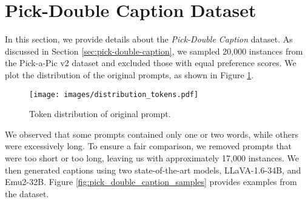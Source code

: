 

\section{Pick-Double Caption Dataset}
\label{sec:appendix_double_caption_dataset}
In this section, we provide details about the \textit{Pick-Double Caption} dataset. As discussed in Section \ref{sec:pick-double-caption}, we sampled 20,000 instances from the Pick-a-Pic v2 dataset and excluded those with equal preference scores. We plot the distribution of the original prompts, as shown in Figure \ref{fig:token-distribution}.

\begin{figure}[h]
    \centering
    \texttt{[image: images/distribution\_tokens.pdf]}
    \vspace{-1em}
    \caption{Token distribution of original prompt.}
    \label{fig:token-distribution}
\end{figure}

We observed that some prompts contained only one or two words, while others were excessively long. To ensure a fair comparison, we removed prompts that were too short or too long, leaving us with approximately 17,000 instances. We then generated captions using two state-of-the-art models, LLaVA-1.6-34B, and Emu2-32B. Figure \ref{fig:pick_double_caption_samples} provides examples from the dataset.

